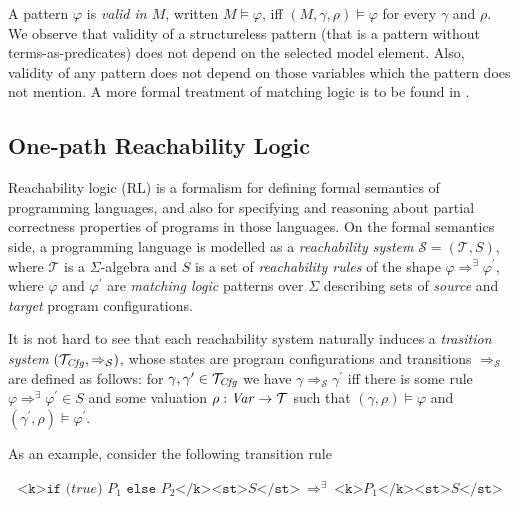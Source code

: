 A pattern $\varphi$ is \emph{valid in $M$}, written $M \vDash \varphi$, iff $(M, \gamma, \rho) \vDash \varphi$
for every $\gamma$ and $\rho$.
We observe that validity of a structureless pattern (that is a pattern without terms-as-predicates) does not depend on the selected model element.
Also, validity of any pattern does not depend on those variables which the pattern does not mention.
A more formal treatment of matching logic is to be found in .


\subsection{One-path Reachability Logic}
Reachability logic \cite{RosuS12oopsla, StefanescuCMMSR19} (RL) is a formalism for
defining formal semantics of programming languages,
and also for specifying and reasoning about partial correctness properties
of programs in those languages.
On the formal semantics side, a programming language is modelled as a \emph{reachability system}
$\mathcal{S} = (\mathcal{T}, S)$, where $\mathcal{T}$ is a $\Sigma$-algebra
and $S$ is a set of \emph{reachability rules} of the shape $\varphi \Rightarrow^\exists \varphi^\prime$,
where $\varphi$ and $\varphi^\prime$ are \emph{matching logic} patterns over $\Sigma$
describing sets of \emph{source} and \emph{target} program configurations.

It is not hard to see that each reachability system naturally
induces a \emph{trasition system} $(\mathcal{T}_{\mathit{Cfg}} , \Rightarrow_{\mathcal{S}})$, whose states are program configurations and
transitions  $\Rightarrow_{\mathcal{S}}$ are defined as follows: for $\gamma,
\gamma^\prime \in \mathcal{T}_{\mathit{Cfg}}$ we have $\gamma \Rightarrow_{\mathcal{S}} \gamma^\prime$
iff there is some rule $\varphi \Rightarrow^\exists \varphi^\prime \in S$
and some valuation $\rho : \mathit{Var} \to \mathcal{T}$ such that $(\gamma, \rho) \vDash \varphi$
and $(\gamma^\prime , \rho) \vDash \varphi^\prime$.

As an example, consider the following transition rule

\begin{equation}\label{eqn:ruleIfTrue}
    \begin{aligned}
    \texttt{<k>if (} \mathit{true} \texttt{) }P_1\texttt{ else } P_2 \texttt{</k><st>} S \texttt{</st>} 
    \ \Rightarrow^{\exists}\ \texttt{<k>}P_1 \texttt{</k><st>} S \texttt{</st>}
    \end{aligned}
\end{equation}


